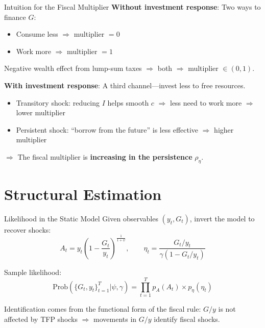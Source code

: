 \documentclass[blue]{beamer}
\begin{document}
\begin{frame}{Intuition for the Fiscal Multiplier}
	\textbf{Without investment response}: Two ways to finance $G$:
	\begin{itemize}
		\item Consume less $\Rightarrow$ multiplier $= 0$
		\item Work more $\Rightarrow$ multiplier $= 1$
	\end{itemize}
	Negative wealth effect from lump-sum taxes $\Rightarrow$ both $\Rightarrow$ multiplier $\in (0, 1)$.
	
	\bigskip
	\textbf{With investment response}: A third channel---invest less to free resources.
	\begin{itemize}
		\item Transitory shock: reducing $I$ helps smooth $c$ $\Rightarrow$ less need to work more $\Rightarrow$ lower multiplier
		\item Persistent shock: ``borrow from the future'' is less effective $\Rightarrow$ higher multiplier
	\end{itemize}
	
	$\Rightarrow$ The fiscal multiplier is \textbf{increasing in the persistence} $\rho_\eta$.
\end{frame}

\section{Structural Estimation}

\begin{frame}{Likelihood in the Static Model}
	Given observables $(y_t, G_t)$, invert the model to recover shocks:
	\[
	A_t = y_t \left(1 - \frac{G_t}{y_t}\right)^{\frac{1}{1+\psi}}, \qquad \eta_t = \frac{G_t/y_t}{\gamma(1 - G_t/y_t)}
	\]
	
	Sample likelihood:
	\[
	\text{Prob}(\{G_t, y_t\}_{t=1}^{T} | \psi, \gamma) = \prod_{t=1}^{T} p_A(A_t) \times p_\eta(\eta_t)
	\]
	
	Identification comes from the functional form of the fiscal rule: $G/y$ is not affected by TFP shocks $\Rightarrow$ movements in $G/y$ identify fiscal shocks.
\end{frame}
\end{document}
